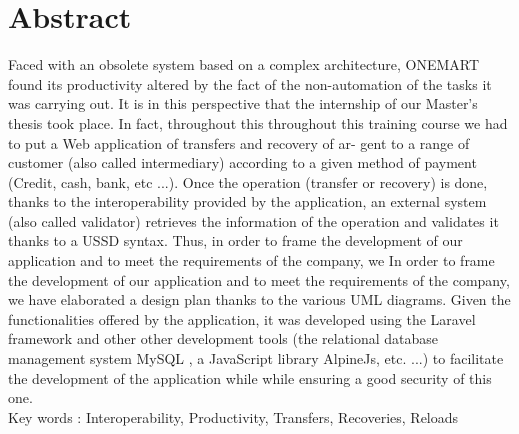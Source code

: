 \chapter*{Abstract}
\thispagestyle{empty}
	Faced with an obsolete system based on a complex architecture, ONEMART
	found its productivity altered by the fact of the non-automation of the tasks it was carrying out.
	It is in this perspective that the internship of our Master's thesis took place. In fact, throughout this
	throughout this training course we had to put a Web application of transfers and recovery of ar-
	gent to a range of customer (also called intermediary) according to a given method of payment (Credit,
	cash, bank, etc ...). Once the operation (transfer or recovery) is done, thanks to the
	interoperability provided by the application, an external system (also called validator)
	retrieves the information of the operation and validates it thanks to a USSD syntax.
	Thus, in order to frame the development of our application and to meet the requirements of the company, we
	In order to frame the development of our application and to meet the requirements of the company, we have elaborated a design plan thanks to the various UML diagrams. Given the
	functionalities offered by the application, it was developed using the Laravel framework and other
	other development tools (the relational database management system MySQL ,
	a JavaScript library AlpineJs, etc. ...) to facilitate the development of the application while
	while ensuring a good security of this one.\\
	
	Key words : Interoperability, Productivity, Transfers, Recoveries, Reloads